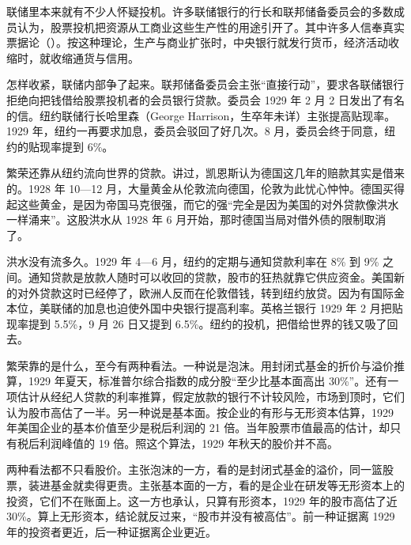 联储里本来就有不少人怀疑投机。许多联储银行的行长和联邦储备委员会的多数成员认为，股票投机把资源从工商业这些生产性的用途引开了\cite{frh2013}。其中许多人信奉真实票据论（）。按这种理论，生产与商业扩张时，中央银行就发行货币，经济活动收缩时，就收缩通货与信用\cite{frh2013}。

怎样收紧，联储内部争了起来。联邦储备委员会主张“直接行动”，要求各联储银行拒绝向把钱借给股票投机者的会员银行贷款\cite{frh2013}。委员会 1929 年 2 月 2 日发出了有名的信\cite{frh2013}。纽约联储行长哈里森（George Harrison，生卒年未详）主张提高贴现率\cite{frh2013}。1929 年，纽约一再要求加息，委员会驳回了好几次\cite{frh2013}。8 月，委员会终于同意，纽约的贴现率提到 6\%\cite{frh2013}。

繁荣还靠从纽约流向世界的贷款。讲过，凯恩斯认为德国这几年的赔款其实是借来的。1928 年 10—12 月，大量黄金从伦敦流向德国，伦敦为此忧心忡忡\cite{brown1940}。德国买得起这些黄金，是因为帝国马克很强，而它的强“完全是因为美国的对外贷款像洪水一样涌来”\cite{brown1940}。这股洪水从 1928 年 6 月开始，那时德国当局对借外债的限制取消了\cite{brown1940}。

洪水没有流多久。1929 年 4—6 月，纽约的定期与通知贷款利率在 8\% 到 9\% 之间\cite{brown1940}。通知贷款是放款人随时可以收回的贷款，股市的狂热就靠它供应资金\cite{frh2013}。美国新的对外贷款这时已经停了，欧洲人反而在伦敦借钱，转到纽约放贷\cite{brown1940}。因为有国际金本位，美联储的加息也迫使外国中央银行提高利率\cite{frh2013}。英格兰银行 1929 年 2 月把贴现率提到 5.5\%，9 月 26 日又提到 6.5\%\cite{boe2017}。纽约的投机，把借给世界的钱又吸了回去。

繁荣靠的是什么，至今有两种看法。一种说是泡沫。用封闭式基金的折价与溢价推算，1929 年夏天，标准普尔综合指数的成分股“至少比基本面高出 30\%”\cite{delong1990}。还有一项估计从经纪人贷款的利率推算，假定放款的银行不计较风险，市场到顶时，它们认为股市高估了一半\cite{delong1990}。另一种说是基本面。按企业的有形与无形资本估算，1929 年美国企业的基本价值至少是税后利润的 21 倍\cite{mcgrattan2003}。当年股票市值最高的估计，却只有税后利润峰值的 19 倍\cite{mcgrattan2003}。照这个算法，1929 年秋天的股价并不高。

两种看法都不只看股价。主张泡沫的一方，看的是封闭式基金的溢价，同一篮股票，装进基金就卖得更贵。主张基本面的一方，看的是企业在研发等无形资本上的投资，它们不在账面上。这一方也承认，只算有形资本，1929 年的股市高估了近 30\%。算上无形资本，结论就反过来，“股市并没有被高估”\cite{mcgrattan2003}。前一种证据离 1929 年的投资者更近，后一种证据离企业更近。


